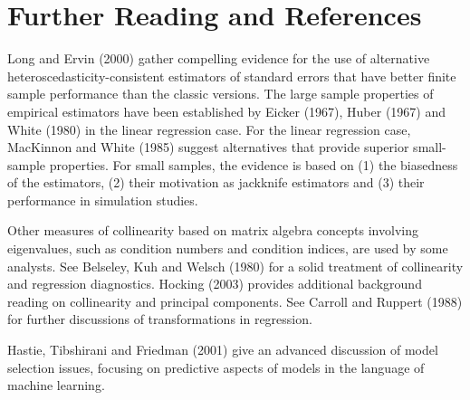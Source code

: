 \section{Further Reading and References}

Long and Ervin (2000) gather compelling evidence for the use of
alternative \newline heteroscedasticity-consistent estimators of
standard errors that have better finite sample performance than the
classic versions. The large sample properties of empirical
estimators have been established by Eicker (1967), Huber (1967) and
White (1980) in the linear regression case. For the linear
regression case, MacKinnon and White (1985) suggest alternatives
that provide superior small-sample properties. For small samples,
the evidence is based on (1) the biasedness of the estimators, (2)
their motivation as jackknife estimators and (3) their performance
in simulation studies.

Other measures of collinearity based on matrix algebra concepts
involving eigenvalues, such as condition numbers and condition
indices, are used by some analysts. See Belseley, Kuh and Welsch
(1980) for a solid treatment of collinearity and regression
diagnostics. Hocking (2003) provides additional background reading
on collinearity and principal components. See Carroll and Ruppert
(1988) for further discussions of transformations in regression.

Hastie, Tibshirani and Friedman (2001) give an advanced discussion
of model selection issues, focusing on predictive aspects of models
in the language of machine learning.

\bigskip

